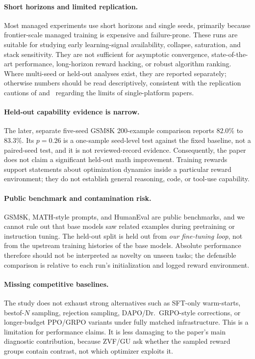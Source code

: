 \paragraph{Short horizons and limited replication.}
Most managed experiments use short horizons and single seeds, primarily because
frontier-scale managed training is expensive and failure-prone.  These runs are
suitable for studying early learning-signal availability, collapse, saturation,
and stack sensitivity.  They are not sufficient for asymptotic convergence,
state-of-the-art performance, long-horizon reward hacking, or robust algorithm
ranking.  Where multi-seed or held-out analyses exist, they are reported
separately; otherwise numbers should be read descriptively, consistent with the
replication cautions of \citet{henderson2018deep}
and~\citet{jordan2024benchmarking} regarding the limits of
single-platform papers.

\paragraph{Held-out capability evidence is narrow.}
The later, separate five-seed GSM8K 200-example comparison reports $82.0\%$ to
$83.3\%$. Its $p=0.26$ is a one-sample seed-level test against the fixed
baseline, not a paired-seed test, and it is not reviewed-record evidence.
Consequently, the paper does not claim a significant held-out math improvement.
Training rewards support statements about optimization dynamics
inside a particular reward environment; they do not establish general reasoning,
code, or tool-use capability.

\paragraph{Public benchmark and contamination risk.}
GSM8K, MATH-style prompts, and HumanEval are public benchmarks, and we cannot
rule out that base models saw related examples during pretraining or instruction
tuning.  The held-out split is held out from \emph{our fine-tuning loop}, not
from the upstream training histories of the base models.  Absolute performance
therefore should not be interpreted as novelty on unseen tasks; the defensible
comparison is relative to each run's initialization and logged reward
environment.

\paragraph{Missing competitive baselines.}
The study does not exhaust strong alternatives such as SFT-only warm-starts,
bestof-$N$ sampling, rejection sampling, DAPO/Dr.~GRPO-style corrections, or
longer-budget PPO/GRPO variants under fully matched infrastructure.  This is a
limitation for performance claims.  It is less damaging to the paper's main
diagnostic contribution, because ZVF/GU ask whether the sampled reward groups
contain contrast, not which optimizer exploits it.


